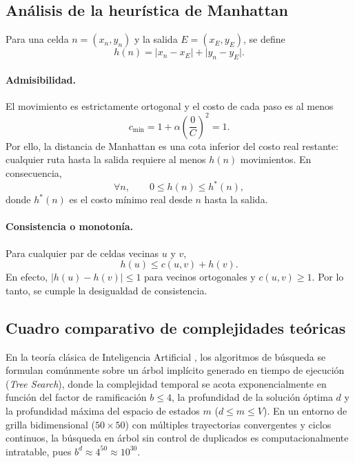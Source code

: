 \documentclass[11pt,letterpaper]{article}
\begin{document}
\subsection{Análisis de la heurística de Manhattan}

Para una celda $n=(x_n,y_n)$ y la salida $E=(x_E,y_E)$, se define
\[
    h(n)=\lvert x_n-x_E\rvert+\lvert y_n-y_E\rvert.
\]

\paragraph{Admisibilidad.}
El movimiento es estrictamente ortogonal y el costo de cada paso es al menos
\[
    c_{\min}
    =1+\alpha\left(\frac{0}{C}\right)^2
    =1.
\]
Por ello, la distancia de Manhattan es una cota inferior del costo real restante: cualquier ruta hasta la salida requiere al menos $h(n)$ movimientos. En consecuencia,
\[
    \forall n,\qquad 0\leq h(n)\leq h^{*}(n),
\]
donde $h^{*}(n)$ es el costo mínimo real desde $n$ hasta la salida.

\paragraph{Consistencia o monotonía.}
Para cualquier par de celdas vecinas $u$ y $v$,
\[
    h(u)\leq c(u,v)+h(v).
\]
En efecto, $\lvert h(u)-h(v)\rvert\leq 1$ para vecinos ortogonales y $c(u,v)\geq 1$. Por lo tanto, se cumple la desigualdad de consistencia.

\subsection{Cuadro comparativo de complejidades teóricas}

En la teoría clásica de Inteligencia Artificial \cite{russell2020}, los algoritmos de búsqueda se formulan comúnmente sobre un árbol implícito generado en tiempo de ejecución (\textit{Tree Search}), donde la complejidad temporal se acota exponencialmente en función del factor de ramificación $b \le 4$, la profundidad de la solución óptima $d$ y la profundidad máxima del espacio de estados $m$ ($d \le m \le V$). En un entorno de grilla bidimensional ($50 \times 50$) con múltiples trayectorias convergentes y ciclos continuos, la búsqueda en árbol sin control de duplicados es computacionalmente intratable, pues $b^d \approx 4^{50} \approx 10^{30}$.
\end{document}
